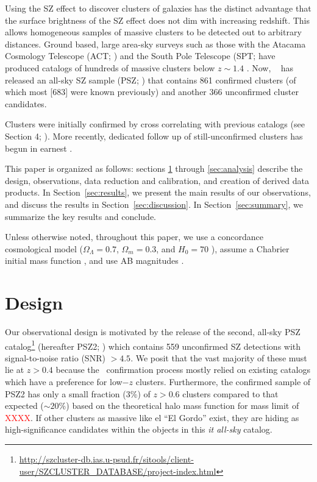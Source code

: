 \documentclass[apj, revtex4-1]{emulateapj}
\newcommand{\editorial}[1]{\textcolor{red}{#1}}
\begin{document}
Using the SZ effect to discover clusters of galaxies has the distinct advantage that the surface brightness of the SZ effect does not dim with increasing redshift. This allows homogeneous samples of massive clusters to be detected out to arbitrary distances. Ground based, large area-sky surveys such as those with the Atacama Cosmology Telescope (ACT; \citealt{Swetz2011}) and the South Pole Telescope (SPT; \citealt{Carlstrom2011} have produced catalogs of hundreds of massive clusters below $z \sim 1.4$ . Now, \planck\ \citep{Tauber2010, PlanckCollaboration2011} has released an all-sky SZ sample (PSZ; \citealt{PlanckCollaboration2014, PlanckCollaboration2015}) that contains 861 confirmed clusters (of which most [683] were known previously) and another 366 unconfirmed cluster candidates.

Clusters were initially confirmed by cross correlating with previous catalogs (see Section 4; \citealt{PlanckCollaboration2014}). More recently, dedicated follow up of still-unconfirmed clusters has begun in earnest .

This paper is organized as follows: sections \ref{sec:design} through \ref{sec:analysis} describe the design, observations, data reduction and calibration, and creation of derived data products. In Section~\ref{sec:results}, we present the main results of our observations, and discuss the results in Section~\ref{sec:discussion}. In Section~\ref{sec:summary}, we summarize the key results and conclude.

Unless otherwise noted, throughout this paper, we use a concordance cosmological model ($\Omega_\Lambda = 0.7$, $\Omega_m = 0.3$, and $H_0= 70$ \kms \permpc), assume a Chabrier initial mass function \citep{Chabrier2003}, and use AB magnitudes \citep{Oke1974}.

\section{Design}\label{sec:design}
Our observational design is motivated by the release of the second, all-sky PSZ catalog\footnote{\url{http://szcluster-db.ias.u-psud.fr/sitools/client-user/SZCLUSTER_DATABASE/project-index.html}} (hereafter PSZ2; \citealt{PlanckCollaboration2015}) which contains 559 unconfirmed SZ detections with signal-to-noise ratio (SNR) $> 4.5$. We posit that the vast majority of these must lie at $z>0.4$ because the \planck\ confirmation process \citep{PlanckCollaboration2014} mostly relied on existing catalogs which have a preference for low$-z$ clusters. Furthermore, the confirmed sample of PSZ2 has only a small fraction (3\%) of $z > 0.6$ clusters compared to that expected ($\sim20$\%) based on the theoretical halo mass function  for mass limit of \editorial{XXXX}. If other clusters as massive like el ``El Gordo'' exist, they are hiding as high-significance candidates within the objects in this \textit{it all-sky} catalog.
\end{document}
